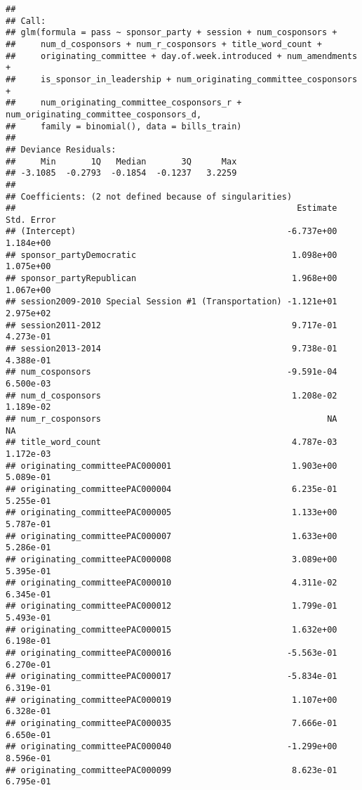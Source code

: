 \documentclass[]{article}
\begin{document}
\begin{verbatim}
## 
## Call:
## glm(formula = pass ~ sponsor_party + session + num_cosponsors + 
##     num_d_cosponsors + num_r_cosponsors + title_word_count + 
##     originating_committee + day.of.week.introduced + num_amendments + 
##     is_sponsor_in_leadership + num_originating_committee_cosponsors + 
##     num_originating_committee_cosponsors_r + num_originating_committee_cosponsors_d, 
##     family = binomial(), data = bills_train)
## 
## Deviance Residuals: 
##     Min       1Q   Median       3Q      Max  
## -3.1085  -0.2793  -0.1854  -0.1237   3.2259  
## 
## Coefficients: (2 not defined because of singularities)
##                                                        Estimate Std. Error
## (Intercept)                                          -6.737e+00  1.184e+00
## sponsor_partyDemocratic                               1.098e+00  1.075e+00
## sponsor_partyRepublican                               1.968e+00  1.067e+00
## session2009-2010 Special Session #1 (Transportation) -1.121e+01  2.975e+02
## session2011-2012                                      9.717e-01  4.273e-01
## session2013-2014                                      9.738e-01  4.388e-01
## num_cosponsors                                       -9.591e-04  6.500e-03
## num_d_cosponsors                                      1.208e-02  1.189e-02
## num_r_cosponsors                                             NA         NA
## title_word_count                                      4.787e-03  1.172e-03
## originating_committeePAC000001                        1.903e+00  5.089e-01
## originating_committeePAC000004                        6.235e-01  5.255e-01
## originating_committeePAC000005                        1.133e+00  5.787e-01
## originating_committeePAC000007                        1.633e+00  5.286e-01
## originating_committeePAC000008                        3.089e+00  5.395e-01
## originating_committeePAC000010                        4.311e-02  6.345e-01
## originating_committeePAC000012                        1.799e-01  5.493e-01
## originating_committeePAC000015                        1.632e+00  6.198e-01
## originating_committeePAC000016                       -5.563e-01  6.270e-01
## originating_committeePAC000017                       -5.834e-01  6.319e-01
## originating_committeePAC000019                        1.107e+00  6.328e-01
## originating_committeePAC000035                        7.666e-01  6.650e-01
## originating_committeePAC000040                       -1.299e+00  8.596e-01
## originating_committeePAC000099                        8.623e-01  6.795e-01

\end{verbatim}
\end{document}

